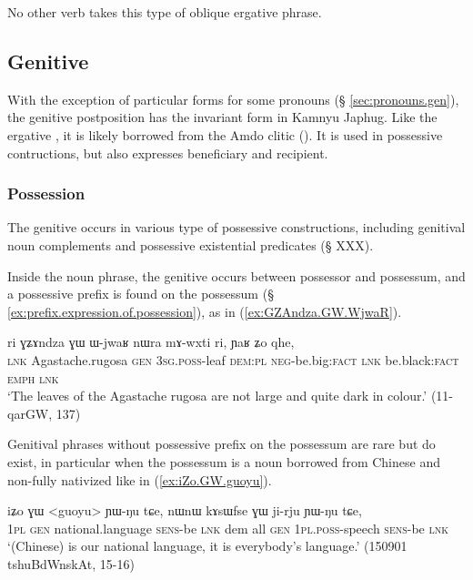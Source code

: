 No other verb takes this type of oblique ergative phrase.

\subsection{Genitive} \label{sec:genitive}
With the exception of particular forms for some pronouns (§ \ref{sec:pronouns.gen}), the genitive postposition has the invariant form  in Kamnyu Japhug. Like the ergative , it is likely borrowed from the Amdo clitic  (\citealt[62]{haller04themchen}). It is used in possessive contructions, but also expresses beneficiary and recipient.

\subsubsection{Possession} \label{sec:gen.possession}
The genitive  occurs in various type of possessive constructions, including genitival noun complements and possessive existential predicates (§ XXX).

Inside the noun phrase, the genitive occurs between possessor and possessum, and a possessive prefix is found on the possessum (§ \ref{ex:prefix.expression.of.possession}), as in (\ref{ex:GZAndza.GW.WjwaR}).  

\begin{exe}
\ex \label{ex:GZAndza.GW.WjwaR}
\gll ri ɣʑɤndza ɣɯ ɯ-jwaʁ nɯra mɤ-wxti ri, ɲaʁ ʑo qhe, \\
\textsc{lnk} Agastache.rugosa \textsc{gen} \textsc{3sg}.\textsc{poss}-leaf \textsc{dem}:\textsc{pl} \textsc{neg}-be.big:\textsc{fact} \textsc{lnk} be.black:\textsc{fact} \textsc{emph} \textsc{lnk} \\
\glt `The leaves of the Agastache rugosa are not large and quite dark in colour.' (11-qarGW, 137)
\end{exe}

Genitival phrases without possessive prefix on the possessum are rare but do exist, in particular when the possessum is a noun borrowed from Chinese and non-fully nativized like  in (\ref{ex:iZo.GW.guoyu}).  

\begin{exe}
\ex \label{ex:iZo.GW.guoyu}
\gll iʑo ɣɯ <guoyu> ɲɯ-ŋu tɕe, nɯnɯ kɤsɯfse ɣɯ ji-rju ɲɯ-ŋu tɕe, \\
\textsc{1pl} \textsc{gen} national.language \textsc{sens}-be \textsc{lnk} dem all \textsc{gen} \textsc{1pl}.\textsc{poss}-speech \textsc{sens}-be \textsc{lnk} \\
\glt `(Chinese) is our national language, it is everybody's language.' (150901 tshuBdWnskAt, 15-16)
\end{exe}

